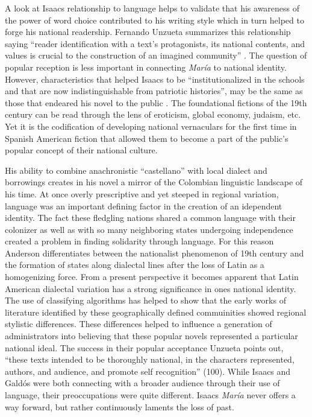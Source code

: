 A look at Isaacs relationship to language helps to validate that his awareness of the power of word choice contributed to his writing style which in turn helped to forge his national readership.
Fernando Unzueta summarizes this relationship saying \enquote{reader identification with a text's protagonists, its national contents, and values is crucial to the construction of an imagined community} \autocite[82]{Unzueta2002}.
The question of popular reception is less important in connecting \textit{María} to national identity.
However, characteristics that helped Isaacs to be \enquote{institutionalized in the schools and that are now indistinguishable from patriotic histories}, may be the same as those that endeared his novel to the public \autocite[add. text]{Sommer1991}.
The foundational fictions of the 19th century can be read through the lens of eroticism, global economy, judaism, etc.
Yet it is the codification of developing national vernaculars for the first time in Spanish American fiction that allowed them to become a part of the public's popular concept of their national culture. 


His ability to combine anachronistic \enquote{castellano} with local dialect and borrowings creates in his novel a mirror of the Colombian linguistic landscape of his time.
At once overly prescriptive and yet steeped in regional variation, language was an important defining factor in the creation of an idependent identity.
The fact these fledgling nations shared a common language with their colonizer as well as with so many neighboring states undergoing independence created a problem in finding solidarity through language.
For this reason Anderson differentiates between the nationalist phenomenon of 19th century and the formation of states along dialectal lines after the loss of Latin as a homogenizing force. 
From a present perspective it becomes apparent that Latin American dialectal variation has a strong significance in ones national identity.
The use of classifying algorithms has helped to show that the early works of literature identified by these geographically defined commuinities showed regional stylistic differences. 
These differences helped to influence a generation of administrators into believing that these popular novels represented a particular national ideal.
The success in their popular acceptance Unzueta points out, \enquote{these texts intended to be thoroughly national, in the characters represented, authors, and audience, and promote self recognition} (100). 
While Isaacs and Galdós were both connecting with a broader audience through their use of language, their preoccupations were quite different.
Isaacs \textit{María} never offers a way forward, but rather continuously laments the loss of past.



